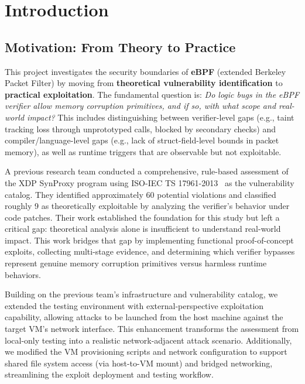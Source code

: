 \chapter{Introduction}

\section{Motivation: From Theory to Practice}

This project investigates the security boundaries of \textbf{eBPF} (extended Berkeley Packet Filter) by moving from \textbf{theoretical vulnerability identification} to \textbf{practical exploitation}. The fundamental question is: \textit{Do logic bugs in the eBPF verifier allow memory corruption primitives, and if so, with what scope and real-world impact?} This includes distinguishing between verifier-level gaps (e.g., taint tracking loss through unprototyped calls, blocked by secondary checks) and compiler/language-level gaps (e.g., lack of struct-field-level bounds in packet memory), as well as runtime triggers that are observable but not exploitable.

\vspace{0.3cm}
\noindent
A previous research team conducted a comprehensive, rule-based assessment of the XDP SynProxy program using ISO-IEC TS 17961-2013~\cite{ISO17961} as the vulnerability catalog. They identified approximately 60 potential violations and classified roughly 9 as theoretically exploitable by analyzing the verifier's behavior under code patches. Their work established the foundation for this study but left a critical gap: theoretical analysis alone is insufficient to understand real-world impact. This work bridges that gap by implementing functional proof-of-concept exploits, collecting multi-stage evidence, and determining which verifier bypasses represent genuine memory corruption primitives versus harmless runtime behaviors.

\vspace{0.3cm}
\noindent
Building on the previous team's infrastructure and vulnerability catalog, we extended the testing environment with external-perspective exploitation capability, allowing attacks to be launched from the host machine against the target VM's network interface. This enhancement transforms the assessment from local-only testing into a realistic network-adjacent attack scenario. Additionally, we modified the VM provisioning scripts and network configuration to support shared file system access (via host-to-VM mount) and bridged networking, streamlining the exploit deployment and testing workflow.

